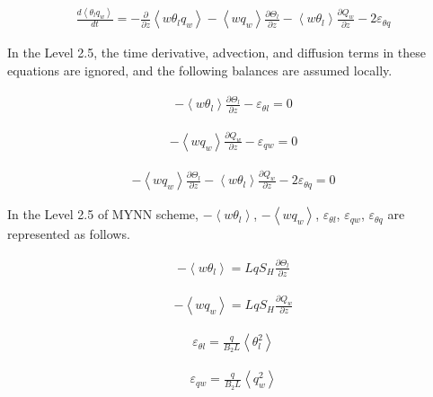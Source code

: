 \begin{eqnarray}
\frac{d\left\langle\theta_{l} q_{w}\right\rangle}{d t}=-\frac{\partial}{\partial z}\left\langle w \theta_{l} q_{w}\right\rangle-\left\langle w q_{w}\right\rangle \frac{\partial \Theta_{l}}{\partial z}-\left\langle w \theta_{l}\right\rangle \frac{\partial Q_{w}}{\partial z}-2 \varepsilon_{\theta q}
\end{eqnarray}

In the Level 2.5, the time derivative, advection, and diffusion terms in
these equations are ignored, and the following balances are assumed
locally.

\begin{eqnarray} -\left\langle w \theta_{l}\right\rangle \frac{\partial \Theta_{l}}{\partial z}-\varepsilon_{\theta l} = 0 \label{6}\end{eqnarray}

\begin{eqnarray} -\left\langle w q_{w}\right\rangle \frac{\partial Q_{w}}{\partial z}-\varepsilon_{q w} = 0 \label{7}\end{eqnarray}

\begin{eqnarray} -\left\langle w q_{w}\right\rangle \frac{\partial \Theta_{l}}{\partial z}-\left\langle w \theta_{l}\right\rangle \frac{\partial Q_{w}}{\partial z}-2 \varepsilon_{\theta q} = 0 \label{8}\end{eqnarray}

In the Level 2.5 of MYNN scheme,
\(-\left\langle w \theta_{l}\right\rangle\),
\(-\left\langle w q_{w}\right\rangle\), \(\varepsilon_{\theta l}\),
\(\varepsilon_{q w}\), \(\varepsilon_{\theta q}\) are represented as
follows.

\begin{eqnarray} -\left\langle w \theta_{l}\right\rangle = LqS_H \frac{\partial \Theta_{l}}{\partial z} \label{9}\end{eqnarray}

\begin{eqnarray} -\left\langle w q_{w}\right\rangle = LqS_H \frac{\partial Q_{w}}{\partial z} \label{10}\end{eqnarray}

\begin{eqnarray}
\varepsilon_{\theta l}=\frac{q}{B_{2} L}\left\langle\theta_{l}^{2}\right\rangle \label{11}
\end{eqnarray}

\begin{eqnarray}
\varepsilon_{q w}=\frac{q}{B_{2} L}\left\langle q_{w}^{2}\right\rangle \label{12}
\end{eqnarray}

